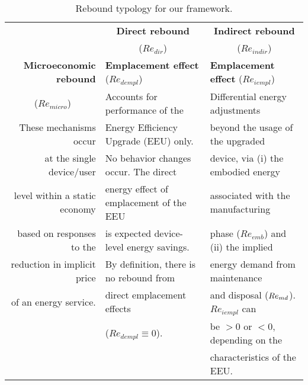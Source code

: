 


\begin{table}
\footnotesize
\begin{center}
\caption{Rebound typology for our framework.}
\label{tab:rebound_typology}
\begin{tabular}{ r l l }
\toprule
                                   & \multicolumn{1}{c}{\textbf{Direct rebound}}  & \multicolumn{1}{c}{\textbf{Indirect rebound}} \\
                                   & \multicolumn{1}{c}{($Re_{dir}$)}             & \multicolumn{1}{c}{($Re_{indir}$)}            \\
\midrule
\textbf{Microeconomic rebound}     & \textbf{Emplacement effect} ($Re_{dempl}$)   & \textbf{Emplacement effect} ($Re_{iempl}$) \\
\multicolumn{1}{c}{($Re_{micro}$)} & Accounts for performance of the              & Differential energy adjustments   \\
These mechanisms occur             & Energy Efficiency Upgrade (EEU) only.        & beyond the usage of the upgraded   \\
at the single device/user          & No behavior changes occur. The direct        & device, via (i) the embodied energy  \\
level within a static economy      & energy effect of emplacement of the EEU      & associated with the manufacturing  \\
based on responses to the          & is expected device-level energy savings.     & phase ($Re_{emb}$) and (ii) the implied  \\
reduction in implicit price        & By definition, there is no rebound from      & energy demand from maintenance   \\
of an energy service.              & direct emplacement effects                   & and disposal ($Re_{md}$). $Re_{iempl}$ can  \\
                                   & ($Re_{dempl} \equiv 0$).                     & be $> 0$ or $< 0$, depending on the   \\
                                   &                                              & characteristics of the EEU.        \\
                                   \cmidrule{2-3}

\end{tabular}
\end{center}
\end{table}
